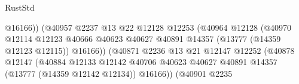 \begin{lexlean}{RustStd}
\begin{coremodule}
                                                          @16166))
                                                      (@40957
                                                        @2237
                                                        @13
                                                        @22
                                                        @12128
                                                        @12253
                                                        (@40964
                                                          @12128
                                                          (@40970
                                                            @12114
                                                            @12123
                                                            @40666
                                                            @40623
                                                            @40627
                                                            @40891
                                                            @14357
                                                            (@13777 (@14359 @12123 @12115))
                                                            @16166))
                                                        (@40871
                                                          @2236
                                                          @13
                                                          @21
                                                          @12147
                                                          @12252
                                                          (@40878
                                                            @12147
                                                            (@40884
                                                              @12133
                                                              @12142
                                                              @40706
                                                              @40623
                                                              @40627
                                                              @40891
                                                              @14357
                                                              (@13777 (@14359 @12142 @12134))
                                                              @16166))
                                                          (@40901
                                                            @2235

\end{coremodule}
\end{lexlean}
